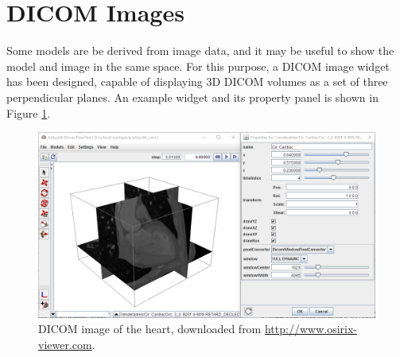 
\let\olditem\item
\newcommand{\lstitem}[2][]{\olditem[{\protect\texttt{#1}}]\mbox{}\newline#2}
\newenvironment{lstdescription}{%
   \iflatexml
   \begin{description}
   \else
   \begin{description}[nolistsep]
   \fi
   \let\item\lstitem
}{\end{description}}

\newenvironment{tightemize}{%
   \iflatexml
   \begin{itemize}
   \else
   \begin{itemize}[nolistsep,noitemsep]
   \fi
}{\end{itemize}}


\section{DICOM Images}
\label{sec:dicom}

Some models are be derived from image data, and it may be useful to show the model
and image in the same space.  For this purpose, a DICOM image widget has been designed,
capable of displaying 3D DICOM volumes as a set of three perpendicular planes.  An
example widget and its property panel is shown in Figure \ref{fig:dicom:heart}.

\begin{figure}[!ht]
   \begin{center}
      \includegraphics[width=\imglength]{images/dicom_heart}
      \caption{DICOM image of the heart, 
      downloaded from \url{http://www.osirix-viewer.com}. \label{fig:dicom:heart}}
   \end{center}
\end{figure}

